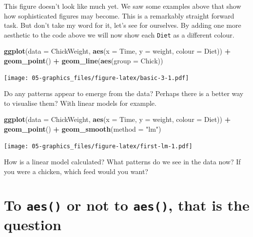 \documentclass[
]{book}
\newenvironment{Shaded}{\begin{snugshade}}{\end{snugshade}}
\newcommand{\DataTypeTok}[1]{\textcolor[rgb]{0.13,0.29,0.53}{#1}}
\newcommand{\KeywordTok}[1]{\textcolor[rgb]{0.13,0.29,0.53}{\textbf{#1}}}
\newcommand{\NormalTok}[1]{#1}
\newcommand{\OperatorTok}[1]{\textcolor[rgb]{0.81,0.36,0.00}{\textbf{#1}}}
\newcommand{\StringTok}[1]{\textcolor[rgb]{0.31,0.60,0.02}{#1}}
\begin{document}
This figure doesn't look like much yet. We saw some examples above that show how sophisticated figures may become. This is a remarkably straight forward task. But don't take my word for it, let's see for ourselves. By adding one more aesthetic to the code above we will now show each \texttt{Diet} as a different colour.

\begin{Shaded}
\begin{Highlighting}[]
\KeywordTok{ggplot}\NormalTok{(}\DataTypeTok{data =}\NormalTok{ ChickWeight, }\KeywordTok{aes}\NormalTok{(}\DataTypeTok{x =}\NormalTok{ Time, }\DataTypeTok{y =}\NormalTok{ weight, }\DataTypeTok{colour =}\NormalTok{ Diet)) }\OperatorTok{+}
\StringTok{  }\KeywordTok{geom\_point}\NormalTok{() }\OperatorTok{+}
\StringTok{  }\KeywordTok{geom\_line}\NormalTok{(}\KeywordTok{aes}\NormalTok{(}\DataTypeTok{group =}\NormalTok{ Chick))}
\end{Highlighting}
\end{Shaded}

\texttt{[image: 05-graphics\_files/figure-latex/basic-3-1.pdf]}

Do any patterns appear to emerge from the data? Perhaps there is a better way to visualise them? With linear models for example.

\begin{Shaded}
\begin{Highlighting}[]
\KeywordTok{ggplot}\NormalTok{(}\DataTypeTok{data =}\NormalTok{ ChickWeight, }\KeywordTok{aes}\NormalTok{(}\DataTypeTok{x =}\NormalTok{ Time, }\DataTypeTok{y =}\NormalTok{ weight, }\DataTypeTok{colour =}\NormalTok{ Diet)) }\OperatorTok{+}
\StringTok{  }\KeywordTok{geom\_point}\NormalTok{() }\OperatorTok{+}
\StringTok{  }\KeywordTok{geom\_smooth}\NormalTok{(}\DataTypeTok{method =} \StringTok{"lm"}\NormalTok{)}
\end{Highlighting}
\end{Shaded}

\texttt{[image: 05-graphics\_files/figure-latex/first-lm-1.pdf]}

How is a linear model calculated? What patterns do we see in the data now? If you were a chicken, which feed would you want?

\hypertarget{to-aes-or-not-to-aes-that-is-the-question}{%
\section{\texorpdfstring{To \texttt{aes()} or not to \texttt{aes()}, that is the question}{To aes() or not to aes(), that is the question}}\label{to-aes-or-not-to-aes-that-is-the-question}}
\end{document}

